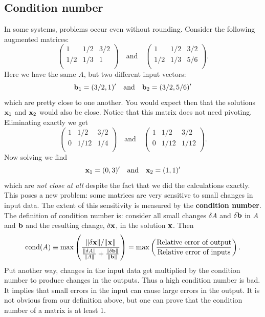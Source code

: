 
\subsection*{Condition number}

In some systems, problems occur even without rounding.
Consider the following augmented matrices:
$$
\left(\begin{array}{cc|c}
        1   & 1/2 & 3/2  \\
        1/2 & 1/3 &  1  \\
      \end{array}\right)
     \quad \text{and} \quad
\left(\begin{array}{cc|c}
        1   & 1/2  & 3/2 \\
        1/2 & 1/3  & 5/6\\
      \end{array}\right).
$$
Here we have the same $A$, but two different input vectors:
$$  \mathbf{b}_1 = (3/2,1)' \quad \textrm{and} \quad \mathbf{b}_2 = (3/2,5/6)'
$$
which are pretty close to one another. You would
expect then that the solutions $\mathbf{x}_1$ and $\mathbf{x}_2$ would also be close.
Notice that this matrix does not need pivoting. Eliminating exactly
we get
$$
\left(\begin{array}{cc|c}
        1 & 1/2  & 3/2  \\
        0 & 1/12 & 1/4 \\
      \end{array}\right)
     \quad \text{and} \quad
\left(\begin{array}{cc|c}
        1 & 1/2  & 3/2 \\
        0 & 1/12 & 1/12\\
      \end{array}\right).
$$
Now solving we find
$$
   \mathbf{x}_1 = (0,3)' \quad \textrm{and} \quad \mathbf{x}_2 = (1,1)'
$$
which are {\em not close at all} despite the fact that we did the
calculations exactly. This poses a new problem: some matrices
are very sensitive to small changes in input data. The extent of
this sensitivity is measured by the {\bf condition number}.
The definition of condition number is: consider all small changes
$\delta A$ and $\delta \mathbf{b}$ in $A$ and $\mathbf{b}$  and the resulting
change, $\delta \mathbf{x}$, in the solution $\mathbf{x}$. Then
$$
      \textrm{cond}(A) \equiv \max \left( \frac{ \|\delta \mathbf{x}\|/\|\mathbf{x}\|}
         { \frac{\|\delta A\|}{\|A\|} + \frac{\|\delta \mathbf{b}\|}{\|\mathbf{b}\|} } \right) =
     \max \left( \frac{\text{Relative error of output}}
                      {\text{Relative error of inputs}} \right).
$$
Put another way, changes in the input data get multiplied by the condition number
to produce changes in the outputs.
Thus a high condition number is bad. It implies that small errors
in the input can cause large errors  in the output.
%
It is not obvious from our definition above, but one can prove that the condition number of a matrix is at least 1.


